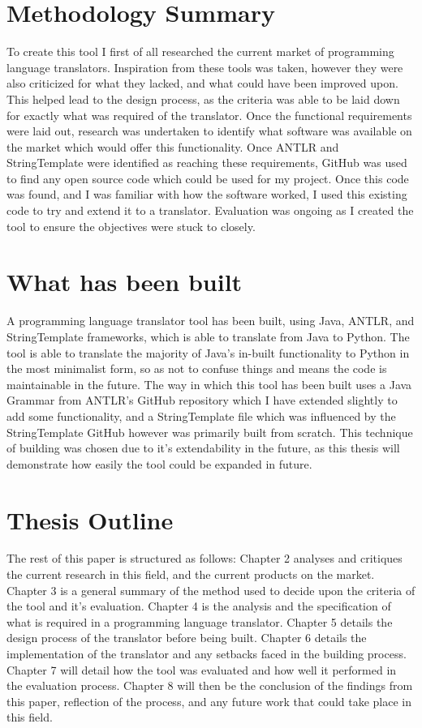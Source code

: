 \documentclass{l4proj}
\begin{document}
\section{Methodology Summary}
To create this tool I first of all researched the current market of programming language translators. Inspiration from these tools was taken, however they were also criticized for what they lacked, and what could have been improved upon.
This helped lead to the design process, as the criteria was able to be laid down for exactly what was required of the translator.
Once the functional requirements were laid out, research was undertaken to identify what software was available on the market which would offer this functionality. 
Once ANTLR and StringTemplate were identified as reaching these requirements, GitHub was used to find any open source code which could be used for my project.
Once this code was found, and I was familiar with how the software worked, I used this existing code to try and extend it to a translator.
Evaluation was ongoing as I created the tool to ensure the objectives were stuck to closely.

\section{What has been built}
A programming language translator tool has been built, using Java, ANTLR, and StringTemplate frameworks, which is able to translate from Java to Python. The tool is able to translate the majority of Java's in-built functionality to Python in the most minimalist form, so as not to confuse things and means the code is maintainable in the future. The way in which this tool has been built uses a Java Grammar from ANTLR's GitHub repository which I have extended slightly to add some functionality, and a StringTemplate file which was influenced by the StringTemplate GitHub however was primarily built from scratch. This technique of building was chosen due to it's extendability in the future, as this thesis will demonstrate how easily the tool could be expanded in future.

\section{Thesis Outline}
The rest of this paper is structured as follows:
Chapter 2 analyses and critiques the current research in this field, and the current products on the market.
Chapter 3 is a general summary of the method used to decide upon the criteria of the tool and it's evaluation.
Chapter 4 is the analysis and the specification of what is required in a programming language translator.
Chapter 5 details the design process of the translator before being built.
Chapter 6 details the implementation of the translator and any setbacks faced in the building process.
Chapter 7 will detail how the tool was evaluated and how well it performed in the evaluation process.
Chapter 8 will then be the conclusion of the findings from this paper, reflection of the process,  and any future work that could take place in this field.
\end{document}
